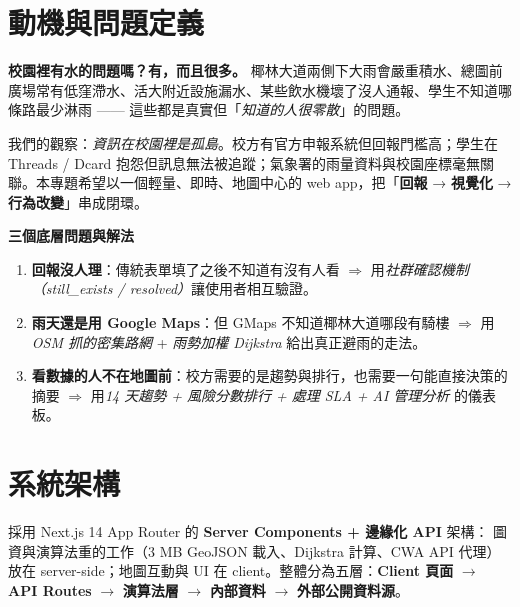 \documentclass[11pt,a4paper]{article}
\begin{document}
\section{動機與問題定義}

\textbf{校園裡有水的問題嗎？有，而且很多。} 椰林大道兩側下大雨會嚴重積水、總圖前廣場常有低窪滯水、活大附近設施漏水、某些飲水機壞了沒人通報、學生不知道哪條路最少淋雨 —— 這些都是真實但「\emph{知道的人很零散}」的問題。

我們的觀察：\emph{資訊在校園裡是孤島}。校方有官方申報系統但回報門檻高；學生在 Threads / Dcard 抱怨但訊息無法被追蹤；氣象署的雨量資料與校園座標毫無關聯。本專題希望以一個輕量、即時、地圖中心的 web app，把「\textbf{回報} → \textbf{視覺化} → \textbf{行為改變}」串成閉環。

\begin{warnbox}
\textbf{\color{warn!70!black}三個底層問題與解法}
\begin{enumerate}
\item \textbf{回報沒人理}：傳統表單填了之後不知道有沒有人看 $\Rightarrow$ 用\emph{社群確認機制（still\_exists / resolved）}讓使用者相互驗證。
\item \textbf{雨天還是用 Google Maps}：但 GMaps 不知道椰林大道哪段有騎樓 $\Rightarrow$ 用\emph{OSM 抓的密集路網} + \emph{雨勢加權 Dijkstra} 給出真正避雨的走法。
\item \textbf{看數據的人不在地圖前}：校方需要的是趨勢與排行，也需要一句能直接決策的摘要 $\Rightarrow$ 用\emph{14 天趨勢 + 風險分數排行 + 處理 SLA + AI 管理分析} 的儀表板。
\end{enumerate}
\end{warnbox}

\clearpage

\section{系統架構}

採用 Next.js 14 App Router 的 \textbf{Server Components + 邊緣化 API} 架構：
圖資與演算法重的工作（3 MB GeoJSON 載入、Dijkstra 計算、CWA API 代理）放在 server-side；地圖互動與 UI 在 client。整體分為五層：\textbf{Client 頁面} $\to$ \textbf{API Routes} $\to$ \textbf{演算法層} $\to$ \textbf{內部資料} $\to$ \textbf{外部公開資料源}。
\end{document}
